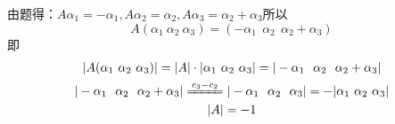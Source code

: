 \documentclass{article}
\begin{document}
\begin{jie}
由题得：$A\alpha_ {1}=-\alpha_{1},A\alpha_{2}=\alpha_{2},A\alpha_{3}=\alpha_{2}+\alpha_{3}$所以
\begin{equation*}
A(\alpha_{1}~\alpha_{2}~\alpha_{3})=(-\alpha_{1}~~\alpha_{2}~~\alpha_{2}+\alpha_{3})
\end{equation*}
即
\begin{gather*}
|A(\alpha_{1}~\alpha_{2}~\alpha_{3})|=|A|\cdot|\alpha_{1}~\alpha_{2}~\alpha_{3}|=|-\alpha_{1}~~\alpha_{2}~~\alpha_{2}+\alpha_{3}|\\
|-\alpha_{1}~~\alpha_{2}~~\alpha_{2}+\alpha_{3}|\xlongequal{c_{3}-c_{2}}|-\alpha_{1}~~\alpha_{2}~~\alpha_{3}|=-|\alpha_{1}~\alpha_{2}~\alpha_{3}|\\
|A|=-1
\end{gather*}
\end{jie}
\end{document}
